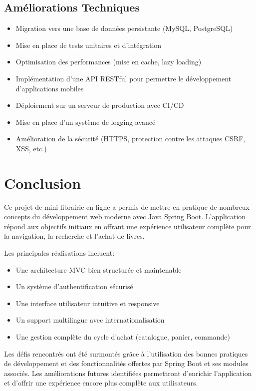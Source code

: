 \documentclass[12pt,a4paper]{report}
\begin{document}
\section{Améliorations Techniques}
\begin{itemize}
    \item Migration vers une base de données persistante (MySQL, PostgreSQL)
    \item Mise en place de tests unitaires et d'intégration
    \item Optimisation des performances (mise en cache, lazy loading)
    \item Implémentation d'une API RESTful pour permettre le développement d'applications mobiles
    \item Déploiement sur un serveur de production avec CI/CD
    \item Mise en place d'un système de logging avancé
    \item Amélioration de la sécurité (HTTPS, protection contre les attaques CSRF, XSS, etc.)
\end{itemize}

\chapter{Conclusion}

Ce projet de mini librairie en ligne a permis de mettre en pratique de nombreux concepts du développement web moderne avec Java Spring Boot. L'application répond aux objectifs initiaux en offrant une expérience utilisateur complète pour la navigation, la recherche et l'achat de livres.

Les principales réalisations incluent:
\begin{itemize}
    \item Une architecture MVC bien structurée et maintenable
    \item Un système d'authentification sécurisé
    \item Une interface utilisateur intuitive et responsive
    \item Un support multilingue avec internationalisation
    \item Une gestion complète du cycle d'achat (catalogue, panier, commande)
\end{itemize}

Les défis rencontrés ont été surmontés grâce à l'utilisation des bonnes pratiques de développement et des fonctionnalités offertes par Spring Boot et ses modules associés. Les améliorations futures identifiées permettront d'enrichir l'application et d'offrir une expérience encore plus complète aux utilisateurs.
\end{document}
